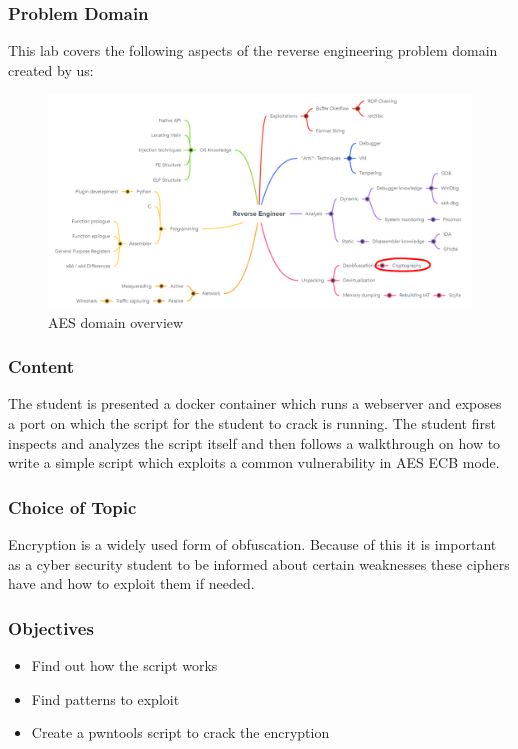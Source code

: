 \subsubsection*{Problem Domain}
This lab covers the following aspects of the reverse engineering problem domain created by us:
\vspace{-2ex}
\begin{figure}[H]
    \includegraphics[width=\textwidth]{resources/aes-overview-light.png}
    \caption{AES domain overview}
    \label{fig:aes-overview}
\end{figure}
\subsubsection*{Content}
The student is presented a docker container which runs a webserver and exposes a port on which the script for the student to crack is running. The student first inspects and analyzes the script itself and then follows a walkthrough on how to write a simple script which exploits a common vulnerability in AES ECB mode. 
\subsubsection*{Choice of Topic}
Encryption is a widely used form of obfuscation. Because of this it is important as a cyber security student to be informed about certain weaknesses these ciphers have and how to exploit them if needed. 
\subsubsection*{Objectives}
\begin{itemize}
    \item Find out how the script works
    \item Find patterns to exploit
    \item Create a pwntools script to crack the encryption
\end{itemize}
